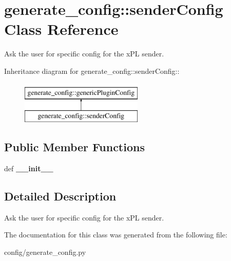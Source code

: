 \hypertarget{classgenerate__config_1_1senderConfig}{
\section{generate\_\-config::senderConfig Class Reference}
\label{classgenerate__config_1_1senderConfig}
}
Ask the user for specific config for the xPL sender.  


Inheritance diagram for generate\_\-config::senderConfig::\begin{figure}[H]
\begin{center}
\leavevmode
\includegraphics[height=2cm]{classgenerate__config_1_1senderConfig}
\end{center}
\end{figure}
\subsection*{Public Member Functions}
\begin{CompactItemize}
\item 
\hypertarget{classgenerate__config_1_1senderConfig_0eaa1e44dfc6199842d784e2211a6f67}{
def \textbf{\_\-\_\-init\_\-\_\-}}
\label{classgenerate__config_1_1senderConfig_0eaa1e44dfc6199842d784e2211a6f67}

\end{CompactItemize}


\subsection{Detailed Description}
Ask the user for specific config for the xPL sender. 

The documentation for this class was generated from the following file:\begin{CompactItemize}
\item 
config/generate\_\-config.py\end{CompactItemize}
